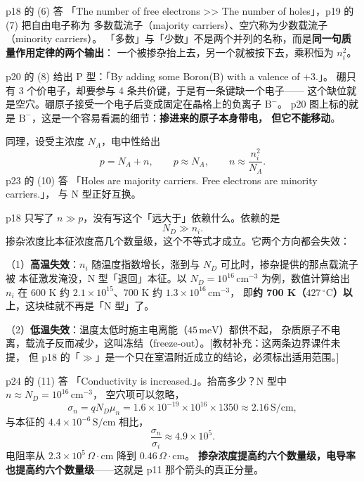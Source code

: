 \documentclass[11pt]{ctexart}
\begin{document}
p18 的 (6) 答 「The number of free electrons >> The number of holes」，p19 的 (7) 把自由电子称为
多数载流子（majority carriers）、空穴称为少数载流子（minority carriers）。
「多数」与「少数」不是两个并列的名称，而是\textbf{同一句质量作用定律的两个输出}：
一个被掺杂抬上去，另一个就被按下去，乘积恒为 $n_i^2$。


p20 的 (8) 给出 P 型：「By adding some Boron(B) with a valence of +3.」。
硼只有 3 个价电子，却要参与 4 条共价键，于是有一条键缺一个电子——
这个缺位就是空穴。硼原子接受一个电子后变成固定在晶格上的负离子 $\mathrm{B}^{-}$。
p20 图上标的就是 $\mathrm{B}^{-}$，这是一个容易看漏的细节：\textbf{掺进来的原子本身带电，
但它不能移动}。

同理，设受主浓度 $N_A$，电中性给出
\[
p=N_A+n,\qquad p\approx N_A,\qquad n\approx\frac{n_i^2}{N_A}.
\]
p23 的 (10) 答 「Holes are majority carriers. Free electrons are minority carriers.」，
与 N 型正好互换。


p18 只写了 $n\gg p$，没有写这个「远大于」依赖什么。依赖的是
\[
N_D\gg n_i .
\]
掺杂浓度比本征浓度高几个数量级，这个不等式才成立。它两个方向都会失效：

（1）\textbf{高温失效}：$n_i$ 随温度指数增长，涨到与 $N_D$ 可比时，掺杂提供的那点载流子被
本征激发淹没，N 型「退回」本征。以 $N_D=10^{16}\,\mathrm{cm^{-3}}$ 为例，数值计算给出
$n_i$ 在 600 K 约 $2.1\times10^{15}$、700 K 约 $1.3\times10^{16}\,\mathrm{cm^{-3}}$，
即\textbf{约 700 K（$427\,{}^\circ\mathrm{C}$）以上}，这块硅就不再是「N 型」了。

（2）\textbf{低温失效}：温度太低时施主电离能（$45\,\mathrm{meV}$）都供不起，
杂质原子不电离，载流子反而减少，这叫冻结（freeze-out）。[教材补充：这两条边界课件未提，
但 p18 的「$\gg$」是一个只在室温附近成立的结论，必须标出适用范围。]


p24 的 (11) 答 「Conductivity is increased.」。抬高多少？N 型中 $n\approx N_D=10^{16}\,\mathrm{cm^{-3}}$，
空穴项可以忽略，
\[
\sigma_n=qN_D\mu_n=1.6\times10^{-19}\times10^{16}\times1350
\approx2.16\,\mathrm{S/cm},
\]
与本征的 $4.4\times10^{-6}\,\mathrm{S/cm}$ 相比，
\[
\frac{\sigma_n}{\sigma_i}\approx4.9\times10^{5}.
\]
电阻率从 $2.3\times10^{5}\,\Omega\cdot\mathrm{cm}$ 降到 $0.46\,\Omega\cdot\mathrm{cm}$。
\textbf{掺杂浓度提高约六个数量级，电导率也提高约六个数量级}——这就是 p11 那个箭头的真正分量。
\end{document}
